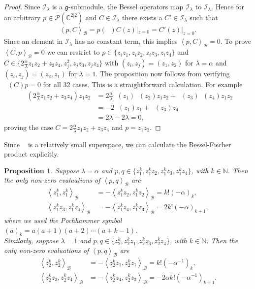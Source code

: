 \documentclass{amsart}
\newtheorem{Prop}[theorem]{Proposition}
\numberwithin{theorem}{section}
\theoremstyle{definition}
\theoremstyle{remark}
\def\N{\mathds{N} }
\def\C{\mathds{C} }
\DeclareMathOperator{\bessel}{\mathcal B_\lambda}
\DeclareMathOperator{\Fock}{\mc F_\lambda}
\newcommand{\bfip}[1]{\left<{#1}\right>_\mathcal B}
\newcommand{\mc}[1]{\mathcal{#1}}
\newcommand{\mg}{{\mathfrak{g}}}
\newcommand{\Ila}{\mc I_\lambda}
\begin{document}
\begin{proof}
Since $\Ila$ is a $\mg$-submodule, the Bessel operators map $\Ila$ to $\Ila$. Hence for an arbitrary $p\in \mathcal P(\C^{2|2})$ and $C \in \Ila$ there exists a $C' \in \Ila$ such that
\begin{align*}
\bfip{p, C} = p(\bessel)C(z) |_{z=0} = C'(z) |_{z=0}.
\end{align*}
Since an element in $\Ila$ has no constant term, this implies $\bfip{p,C} =0$. To prove $\bfip{C,p} =0$ we can restrict to $p \in\{z_i z_1, z_iz_2,z_i z_3, z_i z_4\}$  and $C \in \{2\frac{\alpha}{\lambda}z_1z_2+z_3z_4, z_j^2, z_j z_3, z_j z_4\}$ with $(z_i,z_j)=(z_1,z_2)$ for $\lambda=\alpha$ and $(z_i,z_j)=(z_2,z_1)$ for $\lambda=1$. The proposition now follows from verifying $\bessel(C)p = 0$ for all 32 cases. This is a straightforward calculation. For example
\begin{align*}
\bessel(2\frac{\alpha}{\lambda}z_1z_2+z_3z_4) z_1 z_2 &= 2\frac{\alpha}{\lambda} \bessel(z_1)\bessel(z_2)z_1 z_2 + \bessel(z_3)\bessel(z_4)z_1 z_2 \\
&= -2\bessel(z_1)z_1 +  \bessel(z_3)z_4\\
&= 2\lambda-2\lambda= 0,
\end{align*}
proving the case $C=2\frac{\alpha}{\lambda}z_1z_2+z_3z_4$ and $p=z_1z_2$.
\end{proof}

Since $\Fock$ is a relatively small superspace, we can calculate the Bessel-Fischer product explicitly.

\begin{Prop}\label{PropInnProd}
Suppose $\lambda=\alpha$ and $p,q\in \{z_1^{k}, z_1^kz_2,z_1^kz_3, z_1^kz_4\}$, with $k\in\N$. Then the only non-zero evaluations of $\bfip{p,q}$ are
\begin{align*}
\bfip{z_1^{k}, z_1^{k}} &= -\bfip{z_1^{k}z_2, z_1^{k}z_2} = k!(-\alpha)_{k},\\
\bfip{z_1^{k}z_3, z_1^{k}z_4} &= -\bfip{z_1^{k}z_4, z_1^{k}z_3}  = 2k!(-\alpha)_{k+1},
\end{align*}
where we used the Pochhammer symbol $(a)_k = a(a+1)(a+2)\cdots (a+k-1)$.\\
Similarly, suppose $\lambda=1$ and $p,q\in \{z_2^{k}, z_2^kz_1,z_2^kz_3, z_2^kz_4\}$, with $k\in\N$. Then the only non-zero evaluations of $\bfip{p,q}$ are
\begin{align*}
\bfip{z_2^{k}, z_2^{k}} &= -\bfip{z_2^{k}z_1, z_2^{k}z_1} = k!(-\alpha^{-1})_{k},\\
\bfip{z_2^{k}z_3, z_2^{k}z_4} &= -\bfip{z_2^{k}z_4, z_2^{k}z_3}  = -2 \alpha k!(-\alpha^{-1})_{k+1}.
\end{align*}
\end{Prop}
\end{document}
